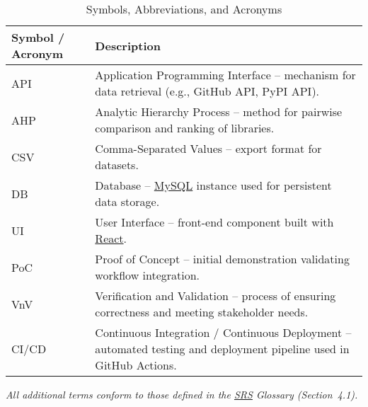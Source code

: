 \documentclass[12pt, titlepage]{article}
\renewcommand{\arraystretch}{1.15}
\begin{document}


\begin{table}[H]
\centering
\caption{Symbols, Abbreviations, and Acronyms}
\setlength{\tabcolsep}{5pt}
\renewcommand{\arraystretch}{1.2}
\footnotesize

\begin{tabularx}{\textwidth}{l X}
\toprule
\textbf{Symbol / Acronym} & \textbf{Description} \\
\midrule
\arrayrulecolor[gray]{0.8}
API & Application Programming Interface – mechanism for data retrieval (e.g., GitHub API, PyPI API). \\
\hline
AHP & Analytic Hierarchy Process – method for pairwise comparison and ranking of libraries. \\
\hline
CSV & Comma-Separated Values – export format for datasets. \\
\hline
DB & Database – \href{https://www.mysql.com/}{MySQL} instance used for persistent data storage. \\
\hline
UI & User Interface – front-end component built with \href{https://react.dev/}{React}. \\
\hline
PoC & Proof of Concept – initial demonstration validating workflow integration. \\
\hline
VnV & Verification and Validation – process of ensuring correctness and meeting stakeholder needs. \\
\hline
CI/CD & Continuous Integration / Continuous Deployment – automated testing and deployment pipeline used in GitHub Actions. \\
\bottomrule
\end{tabularx}
\end{table}

\noindent\textit{All additional terms conform to those defined in the \href{https://github.com/thaafei/DomainX/blob/main/docs/SRS/SRS.pdf}{SRS} Glossary (Section~4.1).}
\newpage

\end{document}
